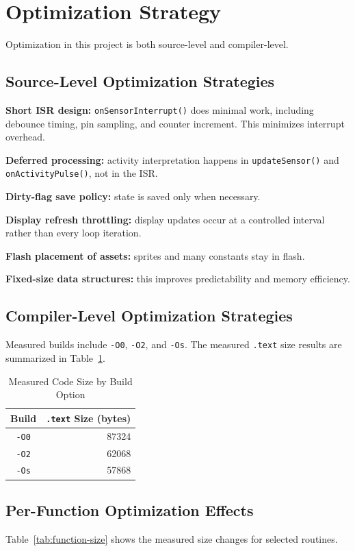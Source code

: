 \documentclass[conference]{IEEEtran}
\begin{document}
\section{Optimization Strategy}
Optimization in this project is both source-level and compiler-level.

\subsection{Source-Level Optimization Strategies}
\textbf{Short ISR design:} \texttt{onSensorInterrupt()} does minimal work, including debounce timing, pin sampling, and counter increment. This minimizes interrupt overhead.

\textbf{Deferred processing:} activity interpretation happens in \texttt{updateSensor()} and \texttt{onActivityPulse()}, not in the ISR.

\textbf{Dirty-flag save policy:} state is saved only when necessary.

\textbf{Display refresh throttling:} display updates occur at a controlled interval rather than every loop iteration.

\textbf{Flash placement of assets:} sprites and many constants stay in flash.

\textbf{Fixed-size data structures:} this improves predictability and memory efficiency.

\subsection{Compiler-Level Optimization Strategies}
Measured builds include \texttt{-O0}, \texttt{-O2}, and \texttt{-Os}. The measured \texttt{.text} size results are summarized in Table~\ref{tab:build-size}.

\begin{table}[!t]
\caption{Measured Code Size by Build Option}
\label{tab:build-size}
\centering
\begin{tabular}{|c|r|}
\hline
\textbf{Build} & \textbf{\texttt{.text} Size (bytes)} \\
\hline
\texttt{-O0} & 87324 \\
\hline
\texttt{-O2} & 62068 \\
\hline
\texttt{-Os} & 57868 \\
\hline
\end{tabular}
\end{table}

\subsection{Per-Function Optimization Effects}
Table~\ref{tab:function-size} shows the measured size changes for selected routines.
\end{document}
